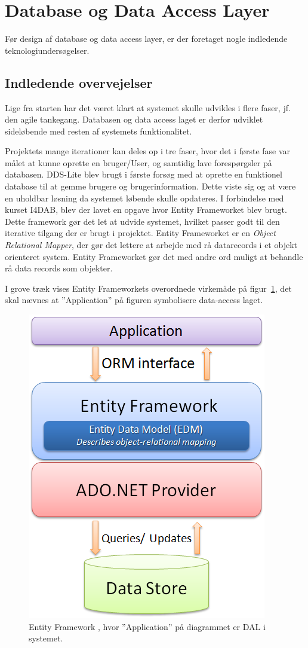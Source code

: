 \section{Database og Data Access Layer}\label{sec:designdatabase}

Før design af database og data access layer, er der foretaget nogle indledende teknologiundersøgelser.

\subsection{Indledende overvejelser}
Lige fra starten har det været klart at systemet skulle udvikles i flere faser, jf. den agile tankegang. Databasen og data access laget er derfor udviklet sideløbende med resten af systemets funktionalitet.

Projektets mange iterationer kan deles op i tre faser, hvor det i første fase var målet at kunne oprette en bruger/User, og samtidig lave forespørgsler på databasen.
DDS-Lite blev brugt i første forsøg med at oprette en funktionel database til at gemme brugere og brugerinformation. Dette viste sig og at være en uholdbar løsning da systemet løbende skulle opdateres. I forbindelse med kurset I4DAB, blev der lavet en opgave hvor Entity Frameworket blev brugt. Dette framework gør det let at udvide systemet, hvilket passer godt til den iterative tilgang der er brugt i projektet. Entity Frameworket er en \textit{Object Relational Mapper}, der gør det lettere at arbejde med rå datarecords i et objekt orienteret system. Entity Frameworket gør det med andre ord muligt at behandle rå data records som objekter.

I grove træk vises Entity Frameworkets overordnede virkemåde på figur~\ref{fig:EFarch}, det skal nævnes at ''Application'' på figuren symbolisere data-access laget.

\begin{figure}[H]
\centering
\includegraphics[width=0.5\linewidth]{figs/dbExtra/EFarch}
\caption{Entity Framework \cite{efArch}, hvor ''Application'' på diagrammet er DAL i systemet.}
\label{fig:EFarch}
\end{figure}


